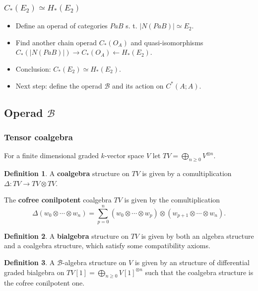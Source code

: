 \documentclass{beamer}
\theoremstyle{definition}
\newtheorem{defi}{Definition}
\begin{document}
\begin{frame}
\frametitle{$C_*(E_2)\simeq H_*(E_2)$}
\begin{itemize}
	\item Define an operad of categories $PaB$ s. t. $|N(PaB)|\simeq E_2$. \checkmark
	\item Find another chain operad $C_*(O_A)$ and quasi-isomorphisms $C_*(|N(PaB)|)\to C_*(O_A)\leftarrow H_*(E_2)$. \checkmark
	\item<2-> Conclusion: $C_*(E_2)\simeq H_*(E_2)$. 
	\item<3-> Next step: define the operad $\mathcal{B}$ and its action on $C^*(A;A)$.
\end{itemize}
\end{frame}
\subsection{Operad $\mathcal{B}$}

\begin{frame}
\frametitle{Tensor coalgebra}

	For a finite dimensional graded $k$-vector space $V$ let $TV=\bigoplus_{n\geq 0} V^{\otimes n}$. \pause
	
	\begin{defi}
		A \textbf{coalgebra} structure on $TV$ is given by a comultiplication $\Delta:TV\to TV\otimes TV$. 
	\end{defi}\pause

\begin{example}
	The \textbf{cofree conilpotent} coalgebra $TV$ is given by the comultiplication
	\[
	\Delta(w_0\otimes\cdots\otimes w_n)=\sum_{p=0}^n(w_0\otimes\cdots \otimes w_p)\otimes (w_{p+1}\otimes\cdots\otimes w_n).
	\]
\end{example}

\end{frame}

\begin{frame}
\begin{defi}
	A \textbf{bialgebra} structure on $TV$ is given by both an algebra structure and a coalgebra structure, which satisfy some compatibility axioms.
\end{defi}\pause

\begin{defi}
	A $\mathcal{B}$-algebra structure on $V$  is given by an structure of differential graded bialgebra on $TV[1]=\bigoplus_{n\geq 0} V[1]^{\otimes n}$ such that the coalgebra structure is the cofree conilpotent one.
\end{defi}
\end{frame}
\end{document}
